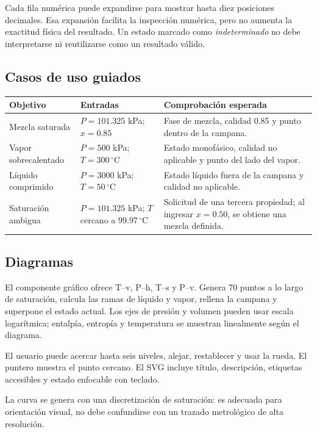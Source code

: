 \documentclass[11pt,a4paper,oneside]{article}
\begin{document}
Cada fila num\'erica puede expandirse para mostrar hasta diez posiciones decimales. Esa expansi\'on facilita la inspecci\'on num\'erica, pero no aumenta la exactitud f\'isica del resultado. Un estado marcado como \emph{indeterminado} no debe interpretarse ni reutilizarse como un resultado v\'alido.

\subsection{Casos de uso guiados}

\begin{longtable}{p{3.3cm}p{4.4cm}p{6.5cm}}
\toprule
Objetivo & Entradas & Comprobaci\'on esperada \\
\midrule
\endhead
Mezcla saturada & $P=101.325$ kPa; $x=0.85$ & Fase de mezcla, calidad 0.85 y punto dentro de la campana. \\
Vapor sobrecalentado & $P=500$ kPa; $T=300\,^\circ$C & Estado monof\'asico, calidad no aplicable y punto del lado del vapor. \\
L\'iquido comprimido & $P=3000$ kPa; $T=50\,^\circ$C & Estado l\'iquido fuera de la campana y calidad no aplicable. \\
Saturaci\'on ambigua & $P=101.325$ kPa; $T$ cercano a $99.97\,^\circ$C & Solicitud de una tercera propiedad; al ingresar $x=0.50$, se obtiene una mezcla definida. \\
\bottomrule
\end{longtable}

\subsection{Diagramas}

El componente gr\'afico ofrece T--v, P--h, T--s y P--v. Genera 70 puntos a lo largo de saturaci\'on, calcula las ramas de l\'iquido y vapor, rellena la campana y superpone el estado actual. Los ejes de presi\'on y volumen pueden usar escala logar\'itmica; entalp\'ia, entrop\'ia y temperatura se muestran linealmente seg\'un el diagrama.

El usuario puede acercar hasta seis niveles, alejar, restablecer y usar la rueda. El puntero muestra el punto cercano. El SVG incluye t\'itulo, descripci\'on, etiquetas accesibles y estado enfocable con teclado.

La curva se genera con una discretizaci\'on de saturaci\'on: es adecuada para orientaci\'on visual, no debe confundirse con un trazado metrol\'ogico de alta resoluci\'on.
\end{document}
